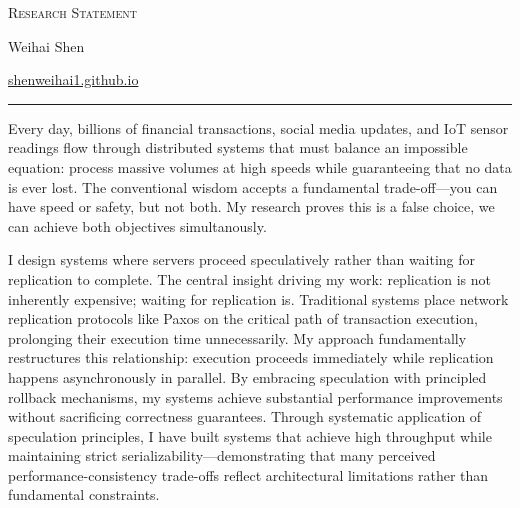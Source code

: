 \documentclass[11pt,letterpaper]{article}
\begin{document}
\begin{center}
    \Large \textsc{Research Statement}
    
    \vspace{0.3em}
    
    \normalsize Weihai Shen
    
    \normalsize \href{https://shenweihai1.github.io/}{shenweihai1.github.io}
    
    \vspace{-0.2em}
    
    \rule{\textwidth}{0.8pt}
\end{center}

\vspace{-0.6em}

Every day, billions of financial transactions, social media updates, and IoT sensor readings flow through distributed systems that must balance an impossible equation: process massive volumes at high speeds while guaranteeing that no data is ever lost. The conventional wisdom accepts a fundamental trade-off—you can have speed or safety, but not both. My research proves this is a false choice, we can achieve both objectives simultanously.

I design systems where servers proceed speculatively rather than waiting for replication to complete. The central insight driving my work: replication is not inherently expensive; waiting for replication is. Traditional systems place network replication protocols like Paxos on the critical path of transaction execution, prolonging their execution time unnecessarily.
My approach fundamentally restructures this relationship: execution proceeds immediately while replication happens asynchronously in parallel.
By embracing speculation with principled rollback mechanisms, my systems achieve substantial performance improvements without sacrificing correctness guarantees. 
Through systematic application of speculation principles, I have built systems that achieve high throughput while maintaining strict serializability—demonstrating that many perceived performance-consistency trade-offs reflect architectural limitations rather than fundamental constraints.
\end{document}
